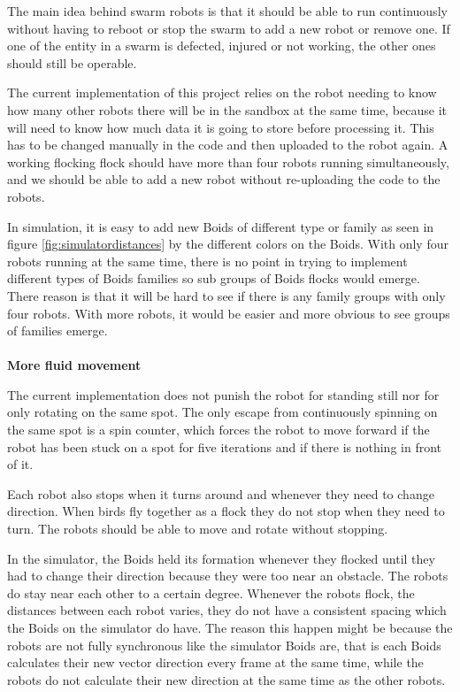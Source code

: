 The main idea behind swarm robots is that it should be able to run continuously without having to reboot or stop the swarm to add a new robot or remove one. If one of the entity in a swarm is defected, injured or not working, the other ones should still be operable.

The current implementation of this project relies on the robot needing to know how many other robots there will be in the sandbox at the same time, because it will need to know how much data it is going to store before processing it. This has to be changed manually in the code and then uploaded to the robot again.
A working flocking flock should have more than four robots running simultaneously, and we should be able to add a new robot without re-uploading the code to the robots.

In simulation, it is easy to add new Boids of different type or family as seen in figure \ref{fig:simulatordistances} by the different colors on the Boids. With only four robots running at the same time, there is no point in trying to implement different types of Boids families so sub groups of Boids flocks would emerge. There reason is that it will be hard to see if there is any family groups with only four robots. With more robots, it would be easier and more obvious to see groups of families emerge. \\\\
\textbf{More fluid movement}

The current implementation does not punish the robot for standing still nor for only rotating on the same spot. The only escape from continuously spinning on the same spot is a spin counter, which forces the robot to move forward if the robot has been stuck on a spot for five iterations and if there is nothing in front of it. 

Each robot also stops when it turns around and whenever they need to change direction. When birds fly together as a flock they do not stop when they need to turn. The robots should be able to move and rotate without stopping.

In the simulator, the Boids held its formation whenever they flocked until they had to change their direction because they were too near an obstacle. The robots do stay near each other to a certain degree. Whenever the robots flock, the distances between each robot varies, they do not have a consistent spacing which the Boids on the simulator do have. The reason this happen might be because the robots are not fully synchronous like the simulator Boids are, that is each Boids calculates their new vector direction every frame at the same time, while the robots do not calculate their new direction at the same time as the other robots. 

